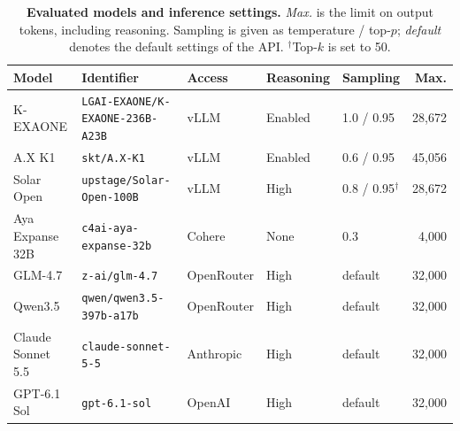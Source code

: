 \begin{table}[t]
\centering
\small
\setlength{\tabcolsep}{4pt}
\caption{\textbf{Evaluated models and inference settings.}
\textit{Max.} is the limit on output tokens, including reasoning.
Sampling is given as temperature / top-$p$; \textit{default} denotes the default settings of the API.
$^\dagger$Top-$k$ is set to 50.}
\label{tab:eval_models}
\begin{tabular*}{\textwidth}{@{\extracolsep{\fill}}lllllr@{}}
\toprule
\textbf{Model} & \textbf{Identifier} & \textbf{Access} & \textbf{Reasoning} & \textbf{Sampling} & \textbf{Max.} \\
\midrule
K-EXAONE          & \texttt{LGAI-EXAONE/K-EXAONE-236B-A23B} & vLLM       & Enabled & 1.0 / 0.95           & 28,672 \\
A.X K1            & \texttt{skt/A.X-K1}                     & vLLM       & Enabled & 0.6 / 0.95           & 45,056 \\
Solar Open        & \texttt{upstage/Solar-Open-100B}        & vLLM       & High    & 0.8 / 0.95$^\dagger$ & 28,672 \\
\midrule
Aya Expanse 32B   & \texttt{c4ai-aya-expanse-32b}           & Cohere     & None    & 0.3                  & 4,000  \\
\midrule
GLM-4.7           & \texttt{z-ai/glm-4.7}                   & OpenRouter & High    & default              & 32,000 \\
Qwen3.5           & \texttt{qwen/qwen3.5-397b-a17b}         & OpenRouter & High    & default              & 32,000 \\
\midrule
Claude Sonnet 5.5 & \texttt{claude-sonnet-5-5}              & Anthropic  & High    & default              & 32,000 \\
GPT-6.1 Sol       & \texttt{gpt-6.1-sol}                    & OpenAI     & High    & default              & 32,000 \\
\bottomrule
\end{tabular*}
\end{table}